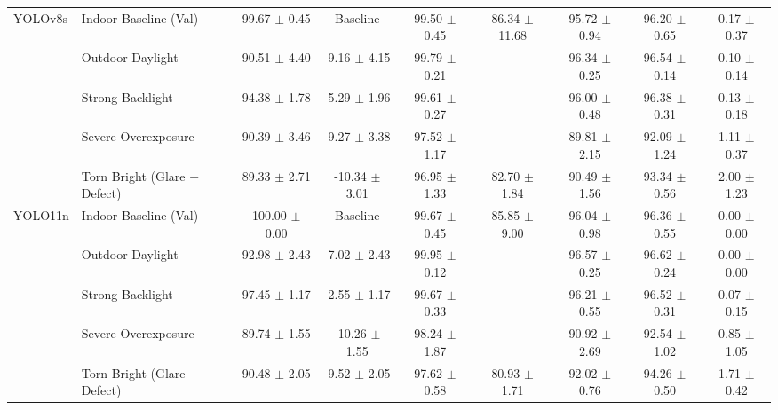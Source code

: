 \documentclass[final,5p,times,twocolumn,authoryear]{elsarticle}
\begin{document}
\begin{table}[t]
{\begin{tabular}{llccccccc}
\midrule
\multirow{5}{*}{YOLOv8s} 
 & Indoor Baseline (Val) & 99.67 $\pm$ 0.45 & Baseline & 99.50 $\pm$ 0.45 & 86.34 $\pm$ 11.68 & 95.72 $\pm$ 0.94 & 96.20 $\pm$ 0.65 & 0.17 $\pm$ 0.37 \\
 & Outdoor Daylight & 90.51 $\pm$ 4.40 & -9.16 $\pm$ 4.15 & 99.79 $\pm$ 0.21 & — & 96.34 $\pm$ 0.25 & 96.54 $\pm$ 0.14 & 0.10 $\pm$ 0.14 \\
 & Strong Backlight & 94.38 $\pm$ 1.78 & -5.29 $\pm$ 1.96 & 99.61 $\pm$ 0.27 & — & 96.00 $\pm$ 0.48 & 96.38 $\pm$ 0.31 & 0.13 $\pm$ 0.18 \\
 & Severe Overexposure & 90.39 $\pm$ 3.46 & -9.27 $\pm$ 3.38 & 97.52 $\pm$ 1.17 & — & 89.81 $\pm$ 2.15 & 92.09 $\pm$ 1.24 & 1.11 $\pm$ 0.37 \\
 & Torn Bright (Glare + Defect) & 89.33 $\pm$ 2.71 & -10.34 $\pm$ 3.01 & 96.95 $\pm$ 1.33 & 82.70 $\pm$ 1.84 & 90.49 $\pm$ 1.56 & 93.34 $\pm$ 0.56 & 2.00 $\pm$ 1.23 \\
\midrule
\multirow{5}{*}{YOLO11n} 
 & Indoor Baseline (Val) & 100.00 $\pm$ 0.00 & Baseline & 99.67 $\pm$ 0.45 & 85.85 $\pm$ 9.00 & 96.04 $\pm$ 0.98 & 96.36 $\pm$ 0.55 & 0.00 $\pm$ 0.00 \\
 & Outdoor Daylight & 92.98 $\pm$ 2.43 & -7.02 $\pm$ 2.43 & 99.95 $\pm$ 0.12 & — & 96.57 $\pm$ 0.25 & 96.62 $\pm$ 0.24 & 0.00 $\pm$ 0.00 \\
 & Strong Backlight & 97.45 $\pm$ 1.17 & -2.55 $\pm$ 1.17 & 99.67 $\pm$ 0.33 & — & 96.21 $\pm$ 0.55 & 96.52 $\pm$ 0.31 & 0.07 $\pm$ 0.15 \\
 & Severe Overexposure & 89.74 $\pm$ 1.55 & -10.26 $\pm$ 1.55 & 98.24 $\pm$ 1.87 & — & 90.92 $\pm$ 2.69 & 92.54 $\pm$ 1.02 & 0.85 $\pm$ 1.05 \\
 & Torn Bright (Glare + Defect) & 90.48 $\pm$ 2.05 & -9.52 $\pm$ 2.05 & 97.62 $\pm$ 0.58 & 80.93 $\pm$ 1.71 & 92.02 $\pm$ 0.76 & 94.26 $\pm$ 0.50 & 1.71 $\pm$ 0.42 \\
\bottomrule
\end{tabular}%
}
\end{table}
\end{document}
